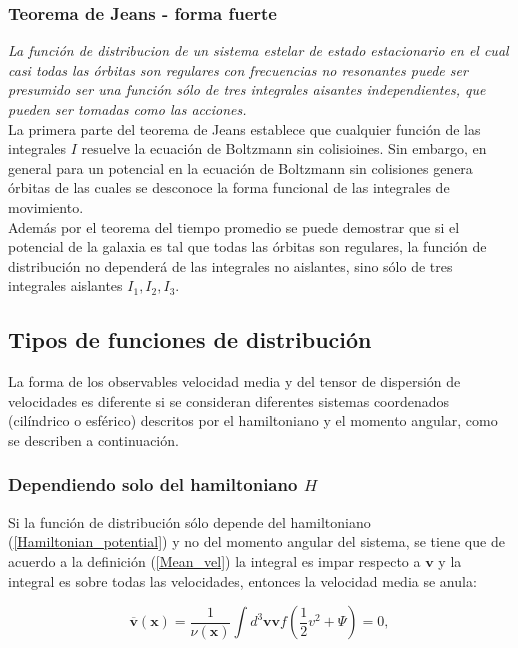 \subsubsection{Teorema de Jeans - forma fuerte}

\emph{La función de distribucion de un sistema estelar de estado estacionario en el cual casi todas las órbitas son regulares con frecuencias no resonantes puede ser presumido ser una función sólo de tres integrales aisantes independientes, que pueden ser tomadas como las acciones.}\\

La primera parte del teorema de Jeans establece que cualquier función de las integrales $I$ resuelve la ecuación de Boltzmann sin colisioines. Sin embargo, en general para un potencial en la ecuación de Boltzmann sin colisiones genera órbitas de las cuales se desconoce la forma funcional de las integrales de movimiento.\\

Además por el teorema del tiempo promedio \cite{BT08} se puede demostrar que si el potencial de la galaxia es tal que todas las órbitas son regulares, la función de distribución no dependerá de las integrales no aislantes, sino sólo de tres integrales aislantes $I_1, I_2, I_3$.

\subsection{Tipos de funciones de distribución }

La forma de los observables velocidad media y del tensor de dispersión de velocidades es diferente si se consideran diferentes sistemas coordenados (cilíndrico o esférico) descritos por el hamiltoniano y el momento angular, como se describen a continuación.

\subsubsection{Dependiendo solo del hamiltoniano $H$}
Si la función de distribución sólo depende del hamiltoniano (\ref{Hamiltonian_potential}) y no del momento angular del sistema, se tiene que de acuerdo a la definición (\ref{Mean_vel}) la integral es impar respecto a $\textbf{v}$ y la integral es sobre todas las velocidades, entonces la velocidad media se anula:

\begin{equation}
\overline{\textbf{v}}(\textbf{x}) = \frac{1}{\nu(\textbf{x})} \int d^3 \textbf{v} \textbf{v} f \left ( \frac{1}{2}v^2  + \Psi \right ) = 0,
\end{equation}

